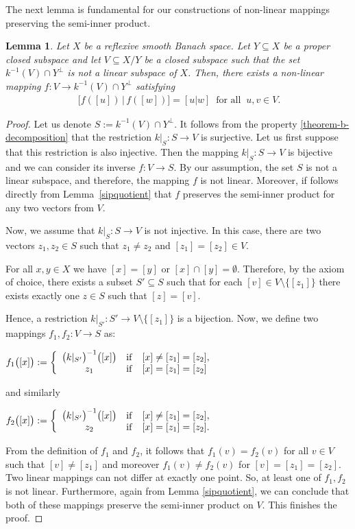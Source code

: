 \documentclass[12pt, reqno]{amsart}
\newtheorem{lemma}[theorem]{Lemma}
\theoremstyle{definition}
\theoremstyle{remark}
\numberwithin{equation}{section}
\newcommand{\sip}[2]{\left[#1|#2\right]}
\begin{document}
The next lemma is fundamental for our constructions of non-linear mappings preserving the semi-inner product.
\begin{lemma}
\label{lemquotient}
Let $X$ be a reflexive smooth Banach space. Let $Y \subseteq X$ be a proper closed subspace and let $V \subseteq X/Y$ be a closed subspace such that the set $k^{-1}(V) \cap Y^{\perp}$ is not a linear subspace of $X$. Then, there exists a non-linear mapping $f\colon V \to k^{-1}(V) \cap Y^{\perp}$ satisfying
\begin{align}\label{map-k-1}
\ \big[ f([u])\, |\, f([w])\big]=\sip{u}{w} \: \text{ for all } \: u, v \in V.
\end{align}
\end{lemma}
\begin{proof}
Let us denote $S := k^{-1}(V) \cap Y^{\perp}$. It follows from the property \eqref{theorem-b-decomposition} that the restriction $k|_S\colon S \to V$ is surjective. Let us first suppose that this restriction is also injective. Then the mapping $k|_S\colon S\to V$ is bijective and we can consider its inverse  $f\colon V\to S$. By our assumption, the set $S$ is not a
linear subspace, and therefore, the mapping $f$ is not linear. Moreover, if follows directly from Lemma~\ref{sipquotient} that $f$ preserves the semi-inner product for any two vectors from $V$.

Now, we assume that $k|_S\colon S \to V$ is not injective. In this case,
there are two vectors $z_1, z_2 \in  S$ such that $z_1\neq z_2$ and $[z_1]=[z_2] \in V$.


For all $x,y\in X$ we have $[x]\!=\![y]$ or $[x]\cap[y]\!=\!\emptyset$. Therefore, by the axiom of choice, there exists a subset $S'\!\subseteq\! S$ such that for each $[v] \in V \setminus \{[z_1]\}$ there exists exactly one $z \in S$ such that $[z]=[v]$.

Hence, a restriction $k|_{S'}\colon S'\to V\setminus \big\{[z_1]\big\}$ is a bijection. Now, we define two mappings $f_1,f_2\colon V\to S$  as:
\begin{center}
$f_1\big([x]\big):=\left\{\begin{array}{ccl}\big(k|_{S'}\big)^{-1}\big([x]\big)& {\rm if}& [x]\neq [z_1]=[z_2],\\
z_1& {\rm if}& [x]= [z_1]=[z_2]\end{array} \right.$
\end{center}
and similarly
\begin{center}
$f_2\big([x]\big):=\left\{\begin{array}{ccl}\big(k|_{S'}\big)^{-1}\big([x]\big)& {\rm if}& [x]\neq [z_1]=[z_2],\\
z_2& {\rm if}& [x]=[z_1]=[z_2].\end{array} \right. $
\end{center}
From the definition of $f_1$ and $f_2$, it follows that $f_1(v)=f_2(v)$ for all $v \in V$ such that $[v] \neq [z_1]$ and moreover $f_1(v) \neq f_2(v)$ for $[v]=[z_1]=[z_2]$. Two linear mappings can not differ at exactly one point. So, at least one of $f_1, f_2$ is not linear. Furthermore, again from Lemma \ref{sipquotient}, we can conclude that both of these mappings preserve the semi-inner product on $V$. This finishes the proof.
\end{proof}
\end{document}
